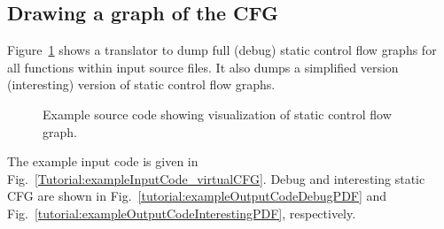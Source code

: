 \subsection{Drawing a graph of the CFG}
Figure~\ref{Tutorial:BuildStaticCFG} shows a translator to dump 
full (debug) static control flow graphs for all functions within input
source files. It also dumps a simplified version (interesting) version of 
static control flow graphs. 

\begin{figure}[!h]
{\indent
  {\mySmallFontSize
    \begin{latexonly}
    
    \end{latexonly}

    \begin{htmlonly}
    
    \end{htmlonly}

  }
}
\label{Tutorial:BuildStaticCFG}
\caption{Example source code showing visualization of static control flow graph.}
\end{figure}

The example input code is given in
Fig.~\ref{Tutorial:exampleInputCode_virtualCFG}. Debug and interesting static CFG 
are shown in Fig.~\ref{tutorial:exampleOutputCodeDebugPDF} and
Fig.~\ref{tutorial:exampleOutputCodeInterestingPDF}, respectively.

